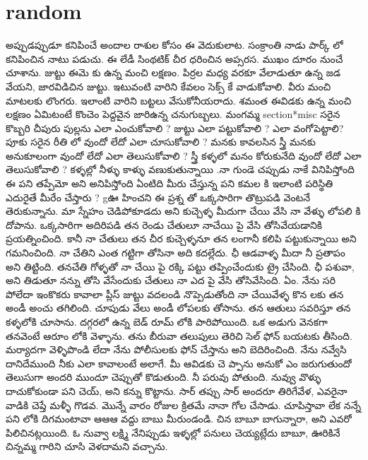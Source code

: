 \documentclass{article}
\begin{document}
\section*{random}
అప్పుడప్పుడూ కనిపించే అందాల రాశుల కోసం ఈ వెదుకులాట.  
సంక్రాంతి నాడు పార్క్ లో కనిపించిన నాటు పడుచు.  ఈ లేడీ సింథటిక్ చీర ధరించిన అప్సరస. ముఖం దూరం నుంచే చూశాను. 
జుట్టు ఈమె కు ఉన్న మంచి లక్షణం.  పిర్రల మధ్య వరకూ వేలాడుతూ ఉన్న జడ వేయని, జారవిడిచిన జుట్టు. 
ఇటువంటి వారిని కేవలం సెక్స్ కే వాడుకోవాలి. వీరు మంచి మాటలకు లొంగరు.  ఇలాంటి వారిని బట్టలు వేసుకోనీయరాదు. 
శమంత ఈవిడకు ఉన్న మంచి లక్షణం ఏమిటంటే కొంచెం పెద్దవైన జారిఉన్న చనుగుబ్బలు. 
మంగమ్మ
section*{misc}
సరైన కొబ్బరి చీపురు పుల్లను ఎలా ఎంచుకోవాలి ? 
జుట్టు ఎలా పట్టుకోవాలి ?
ఎలా వంగోపెట్టాలి?
పూకు సరైన రీతి లో వుందో లేదో ఎలా చూసుకోవాలి ?
మనకు కావలసిన స్త్రీ మనకు అనుకూలంగా వుందో లేదో ఎలా తెలుసుకోవాలి ?
స్త్రీ కళ్ళలో మనం కోరుకునేది వుందో లేదో ఎలా తెలుసుకోవాలి ?
కళ్ళల్లో నీళ్ళు కాళ్ళు వణుకుతున్నాయి
.నా గుండె చప్పుడు నాకే  వినిపిస్తోంది
ఈ పని తప్పేమో అని అనిపిస్తోంది
ఏంటిది మీరు చేస్తున్న పని 
కమల కి ఇలాంటి పరిస్థితి ఎదురైతే మీరేం చేస్తారు ?
gఊ హించని ఈ ప్రశ్న తో ఒక్కసారిగా  తొట్రుపడి వెంటనే తెరుకున్నాను.
మా స్నేహం చెడిపోకూడదు అని
కుచ్చెళ్ళ మీదుగా చేయి వేసి నా వేళ్ళు లోపలి కి దోపాను. ఒక్కసారిగా అదిరిపడి తన రెండు చేతులూ నాచేయి పై వేసి
 తోసివేయడానికి ప్రయత్నించింది. కానీ నా చేతులు తన చీర కుచ్చెళ్ళనూ తన లంగానీ కలిపి పట్టుకున్నాయి అని గమనించింది. 
 నా చేతిని ఎంత గట్టిగా తోసినా అది కదల్లేదు. ఛీ ఆడవాళ్ళ మీదా నీ ప్రతాపం అని తిట్టింది. 
 తనచేతి గోళ్ళతో నా చేయి పై రక్కి పట్టు తప్పించేందుకు ట్రై చేసింది. ఛీ పశువా, అని తిడుతూ నన్ను 
 తోసి వేసేందుకు చేతులు నా ఎద పై వేసి తోసివేసింది. 
ఏం. నేను సరి పోలేదా ఇంకొకరు కావాలా
ప్లీస్ జుట్టు వదలండి నొప్పెడుతోంది 
నా చేయివేళ్ళ కొన లకు తన అండీ అంచు తగిలింది. 
చూపుడు వేలు అండీ లోపలకు తోసాను. తన ఆతులు సవరిస్తూ  తన కళ్ళలోకి చూసాను.
దగ్గరలో ఉన్న బెడ్ రూమ్ లోకి పారిపోయింది. 
ఒక అడుగు వెనకగా తనవెంటే ఆరూం లోకి వెళ్ళాను. తను బీరువా తలుపులు తెరిచి సెల్ ఫోన్ 
బయటకు తీసింది. మర్యాదగా వెళ్ళిపొండి లేదా నేను పోలీసులకు ఫోన్ చేస్తాను అని బెదిరించింది. 
నేను నవ్వేసి దానిదేముంది నీకు ఎలా కావాలంటే అలాగే.
మీ ఆవిడకు చె ప్పాను అనుకో ఎం జరుగుతుందో తెలుసుగా అందరి ముందూ చెప్పుతో కొడుతుంది. నీ పరువు పోతుంది. 
నువ్వు వొళ్ళు దాచుకోకుండా పని చెయ్, అని కన్ను కొట్టాను. సార్ తప్పు సార్ అందరూ తిరిగేవేళ, ఎవరైనా వాడికి 
చెప్తే మళ్ళీ గొడవ. మొన్నే వారం రోజుల క్రితమే నానా గోల చేసాడు. 
చూపిస్తావా లేక నన్నే పని లోకి దిగమంటావా 
ఆఆఆ వద్దు బాబు మీరుండండి. 
చిన బాబూ బాగున్నారా, అని ఎవరో పిలిచినట్లయింది. ఓ నువ్వా లక్ష్మి
నేనిప్పుడు ఇళ్ళల్లో పనులు చెయ్యట్లేదు బాబూ, ఊరికినే చిన్నమ్మ గారిని చూసి వెళదామని వచ్చాను. 
\end{document}
